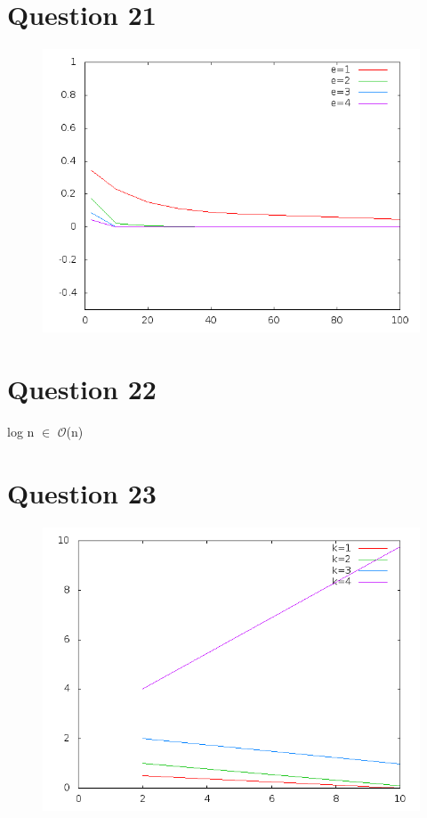 \documentclass[a4paper,12pt]{report}
\begin{document}
\section*{Question 21}
\begin{figure}[!ht]
	\center
	\includegraphics[scale=0.4]{q21.png}
\end{figure}

\section*{Question 22}
log n $\in$ $\mathcal{O}$(n\up{$\varepsilon$})

\newpage

\section*{Question 23}
\begin{figure}[!ht]
	\center
	\includegraphics[scale=0.4]{q23.png}
\end{figure}
\end{document}
